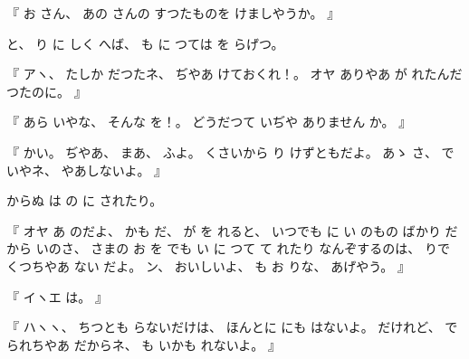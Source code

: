 %
『
お
さん、
%
あの
さんの
すつたものを
けましやうか。
』

%
と、
%
り
に
しく
へば、
%
も
に
つては
を
らげつ。

%
『
アヽ、
%
たしか
だつたネ、
%
ぢやあ
けておくれ！。
%
オヤ
ありやあ
\makeatletter
{}%
\makeatother
{}が
れたんだつたのに。
』

%
『
あら
いやな、
%
そんな
を！。
%
どうだつて
いぢや
ありません
%
か。
』

%
『
かい。
%
ぢやあ、
%
まあ、
%
ふよ。
%
くさいから
り
けずともだよ。
%
あゝ
さ、
%
で
いやネ、
%
やあしないよ。
』

%
からぬ
は
の
に
されたり。

%
『
オヤ
あ
のだよ、
かも
だ、
%
が
を
れると、
%
いつでも
に
い
のもの
ばかり
だから
いのさ、
%
さまの
お
を
でも
い
に
つて
て
れたり
なんぞするのは、
%
りで
くつちやあ
ない
だよ。
%
ン、
%
おいしいよ、
%
も
お
りな、
%
あげやう。
』

%
『
イヽエ
は。
』

%
『
ハヽヽ、
%
ちつとも
らないだけは、
%
ほんとに
にも
はないよ。
%
だけれど、
%
で
られちやあ
だからネ、
%
も
いかも
れないよ。
』

